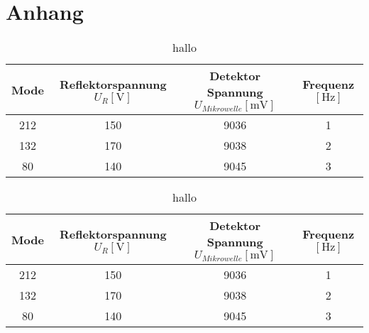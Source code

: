 \section{Anhang}

\begin{table}
    \centering
    \caption{hallo}
    \label{tab:Messreihe11}
    \begin{tabular}{c | c c c}
        \toprule
        Mode & Reflektorspannung $U_{R} [\si{\volt}] $ & Detektor Spannung $ U_{Mikrowelle} [\si{\milli\volt}] $ & Frequenz $[\si{\hertz}]$ \\
        \midrule
        212      &     150          &               9036        &        1  \\
        132      &     170          &               9038        &        2  \\
        80       &     140          &               9045        &        3  \\
    \end{tabular}
\end{table}

\begin{table}
    \centering
    \caption{hallo}
    \label{tab:Messreihe11}
    \begin{tabular}{c || c c c}
        \toprule
        Mode & Reflektorspannung $U_{R} [\si{\volt}] $ & Detektor Spannung $ U_{Mikrowelle} [\si{\milli\volt}] $ & Frequenz $[\si{\hertz}]$ \\
        \midrule
        212      &     150          &               9036        &        1  \\
        132      &     170          &               9038        &        2  \\
        80       &     140          &               9045        &        3  \\
    \end{tabular}
\end{table}